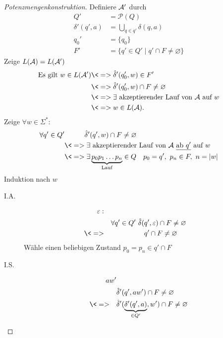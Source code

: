 \begin{proof}[Potenzmengenkonstruktion]
        Definiere $\mathcal{A}'$ durch
        \begin{align*}
                Q' &= \mathcal{P}(Q)\\
                \delta'(q',a) &= \bigcup_{q\in q'} \delta(q,a)\\
                q_0' &= \{q_0\}\\
                F' &= \{ q'\in Q' \mid q'\cap F\neq \varnothing \}
        \end{align*}
        Zeige $L(\mathcal{A})=L(\mathcal{A}')$
        \begin{align*}
                \text{Es gilt } w\in L(\A') &\<=> \hat\delta'(q_0',w)\in F'\\
                &\<=> \hat\delta'(q_0',w)\cap F\neq \varnothing\\
                &\<=> \exists \text{ akzeptierender Lauf von $\A$ auf $w$} \\
                &\<=> w\in L(\A).
        \end{align*}
        Zeige $\forall w\in\Sigma^*$:
        \begin{align*}
                \forall q'\in Q' &\phantom{\<=>} \hat\delta'(q',w)\cap F\neq \varnothing\\
                &\<=> \exists\text{ akzeptierender Lauf von $\A$ \underline{ab $q'$} auf }w\\
                &\<=> \exists \underbrace{p_0p_1\dots p_n}_{\text{Lauf}}\in Q \quad p_0=q',\ p_n\in F,\ n=|w|
        \end{align*}
        Induktion nach $w$
        \begin{description}
        \item[I.A.]
                \begin{alignat*}{2}
                        \Eps:\\
                        &&\forall q'\in Q'\ \hat\delta(&q',\Eps)\cap F\neq \varnothing\\
                        \<=>&& &q'\cap F\neq \varnothing
                \end{alignat*}
                Wähle einen beliebigen Zustand $p_0=p_n\in q'\cap F$
        \item[I.S.]
        \begin{align*}
                aw'&\\
                &\hat\delta'(q',aw')\cap F\neq \varnothing\\
                \<=>\quad& \hat\delta'(\underbrace{\delta'(q',a)}_{\in Q'},w')\cap F\neq\varnothing\\

\end{align*}
\end{description}
\end{proof}
